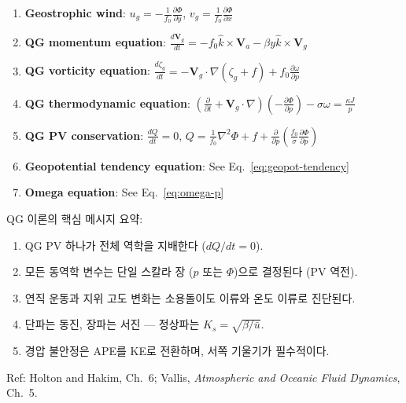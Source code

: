 \begin{enumerate}
  \item \textbf{Geostrophic wind}:
    $\displaystyle u_g = -\frac{1}{f_0}\frac{\partial\Phi}{\partial y}$,
    \quad $v_g = \frac{1}{f_0}\frac{\partial\Phi}{\partial x}$

  \item \textbf{QG momentum equation}:
    $\displaystyle \frac{d\mathbf{V}_g}{dt}
    = -f_0\hat{k}\times\mathbf{V}_a - \beta y\hat{k}\times\mathbf{V}_g$

  \item \textbf{QG vorticity equation}:
    $\displaystyle \frac{d\zeta_g}{dt}
    = -\mathbf{V}_g\cdot\nabla(\zeta_g + f)
    + f_0\frac{\partial\omega}{\partial p}$

  \item \textbf{QG thermodynamic equation}:
    $\displaystyle \left(\frac{\partial}{\partial t}
    + \mathbf{V}_g\cdot\nabla\right)
    \!\left(-\frac{\partial\Phi}{\partial p}\right)
    - \sigma\omega = \frac{\kappa J}{p}$

  \item \textbf{QG PV conservation}:
    $\displaystyle \frac{dQ}{dt} = 0$,
    \quad $Q = \frac{1}{f_0}\nabla^2\Phi + f
    + \frac{\partial}{\partial p}
    \!\left(\frac{f_0}{\sigma}\frac{\partial\Phi}{\partial p}\right)$

  \item \textbf{Geopotential tendency equation}:
    See Eq.~\eqref{eq:geopot-tendency}

  \item \textbf{Omega equation}:
    See Eq.~\eqref{eq:omega-p}
\end{enumerate}


\begin{hisublock}
QG 이론의 핵심 메시지 요약:
\begin{enumerate}
  \item QG PV 하나가 전체 역학을 지배한다 ($dQ/dt = 0$).
  \item 모든 동역학 변수는 단일 스칼라 장 ($p$ 또는 $\Phi$)으로 결정된다 (PV 역전).
  \item 연직 운동과 지위 고도 변화는 소용돌이도 이류와 온도 이류로 진단된다.
  \item 단파는 동진, 장파는 서진 --- 정상파는 $K_s = \sqrt{\beta/\bar{u}}$.
  \item 경압 불안정은 APE를 KE로 전환하며, 서쪽 기울기가 필수적이다.
\end{enumerate}
Ref: Holton and Hakim, Ch.~6; Vallis, \textit{Atmospheric and Oceanic Fluid Dynamics}, Ch.~5.
\end{hisublock}
